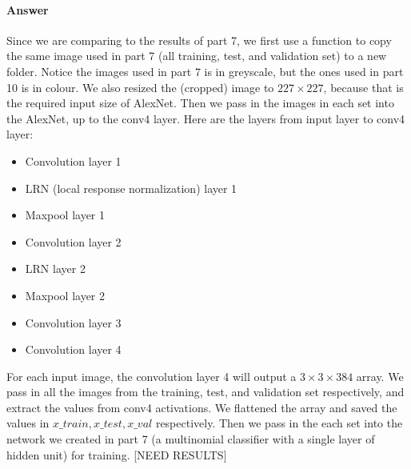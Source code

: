 \documentclass[11pt,twoside]{article}
\begin{document}
\paragraph{Answer}
Since we are comparing to the results of part 7, we first use a function to copy the same image used in part 7 (all training, test, and validation set) to a new folder. Notice the images used in part 7 is in greyscale, but the ones used in part 10 is in colour. We also resized the (cropped) image to $227\times227$, because that is the required input size of AlexNet. 
Then we pass in the images in each set into the AlexNet, up to the conv4 layer. Here are the layers from input layer to conv4 layer:
\begin {itemize}
	\item Convolution layer 1
	\item LRN (local response normalization) layer 1
	\item Maxpool layer 1
	\item Convolution layer 2
	\item LRN layer 2
	\item Maxpool layer 2
	\item Convolution layer 3
	\item Convolution layer 4
\end {itemize}
For each input image, the convolution layer 4 will output a $3\times3\times384$ array. We pass in all the images from the training, test, and validation set respectively, and extract the values from conv4 activations. We flattened the array and saved the values in $x\_train, x\_test, x\_val$ respectively. Then we pass in the each set into the network we created in part 7 (a multinomial classifier with a single layer of hidden unit) for training.
{[}NEED RESULTS{]}

\clearpage
\end{document}
